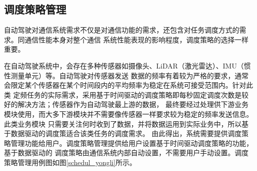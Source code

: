 
\subsection{调度策略管理}
自动驾驶对通信系统需求不仅是对通信功能的需求，还包含对任务调度方式的需求。同通信性能本身对整个通信
系统性能表现的影响程度，调度策略的选择一样重要。

在自动驾驶系统中，会存在多种传感器如摄像头、LiDAR（激光雷达）、IMU（惯性测量单元）等。自动驾驶对传感器发送
数据的频率有着较为严格的要求，通常会限定某个传感器在某个时间段内的平均频率为稳定在系统可接受范围内。针对此类
定频任务的实际需求，采用基于时间驱动的调度策略即每秒固定调度次数是较好的解决方法；传感器作为自动驾驶最上游的数据，
最终要经过处理供下游业务模块使用，而大多下游模块并不需要像传感器一样要求较为稳定的频率发送信息。此类业务模块
只需要关注何时收到了数据，并将数据运用到实际业务中，所以基于数据驱动的调度策适合该类任务的调度需求。
由此得出，系统需要提供调度策略管理功能给用户。调度策略管理提供给用户设置基于时间驱动调度策略的功能，基于数据驱动的
调度策略由通信系统内部自动设置，不需要用户手动设置。调度策略管理用例图如图\ref{schedul_yongli}所示。

